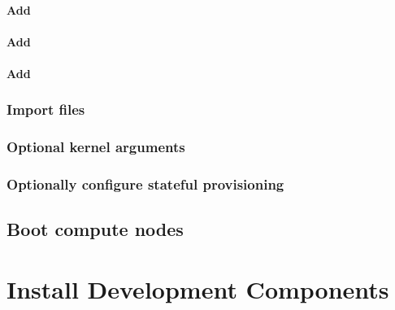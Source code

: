 \documentclass[letterpaper]{article}
\begin{document}
\paragraph{Add \conman{}} \label{sec:add_conman}


\paragraph{Add \nhc{}} \label{sec:add_nhc}


\paragraph{Add \GEOPM{}} \label{sec:add_geopm}


\subsubsection{Import files} \label{sec:file_import}







\subsubsection{Optional kernel arguments} \label{sec:optional_kargs}



\subsubsection{Optionally configure stateful provisioning}


\vspace*{0.15cm}
\subsection{Boot compute nodes} \label{sec:boot_computes}
 

\section{Install \OHPC{} Development Components}


\end{document}
